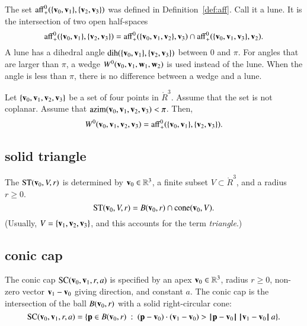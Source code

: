 The set $\op{aff}^0_+(\{\v_0,\v_1\},\{\v_2,\v_3\})$ was defined
in Definition~\ref{def:aff}.  Call it a lune.  It is the intersection
of two open half-spaces
    $$
    \op{aff}^0_+(\{\v_0,\v_1\},\{\v_2,\v_3\})
    =\op{aff}^0_+(\{\v_0,\v_1,\v_2\},\v_3)\cap
    \op{aff}^0_+(\{\v_0,\v_1,\v_3\},\v_2).
        $$
A lune has a dihedral angle $\dih(\{\v_0,\v_1\},\{\v_2,\v_3\})$ between
$0$ and $\pi$.   For angles that are larger than $\pi$,   a wedge
$W^0(\v_0,\v_1,\w_1,\w_2)$ is used instead of the lune.  
When the angle is less than $\pi$, there is no difference between
a wedge and a lune.
%
%
%
%
%
%

\begin{lemma} Let $\{\v_0,\v_1,\v_2,\v_3\}$ be a set of four points
in $\ring{R}^3$.  Assume that the set is not coplanar.
Assume that $\op{azim}(\v_0,\v_1,\v_2,\v_3)<\pi$.
Then,
   $$W^0(\v_0,\v_1,\v_2,\v_3) = \op{aff}^0_+(\{\v_0,\v_1\},\{\v_2,\v_3\}).$$
%
\end{lemma}


\subsection{solid triangle}
%

\begin{definition} The  $\op{ST}(\v_0,V,r)$ is
determined by  $\v_0\in\ring{R}^3$, a finite subset $V\subset\ring{R}^3$,
and a radius $r\ge0$. 
    $$
    \op{ST}(\v_0,V,r) = 
    B(\v_0,r)\cap \op{cone}(\v_0,V).
    $$
(Usually, $V=\{\v_1,\v_2,\v_3\}$, and this accounts for
the term {\it triangle}.)
%
%
%
\end{definition}



\subsection{conic cap}
%


\begin{definition}
The conic cap $\op{SC}(\v_0,\v_1,r,a)$ is specified by an apex
$\v_0\in\ring{R}^3$,  radius $r\ge0$,  non-zero vector $\v_1-\v_0$ giving
direction, and constant $a$.  The conic cap is the intersection of
the ball $B(\v_0,r)$ with a solid right-circular cone:
    $$
    \op{SC}(\v_0,\v_1,r,a)=\{\p \in B(\v_0,r) \mid (\p-\v_0)\cdot (\v_1-\v_0) > \norm{\p}{\v_0}\, \norm{\v_1}{\v_0}\, a\}.
    $$
%
%
%
%
\end{definition}

